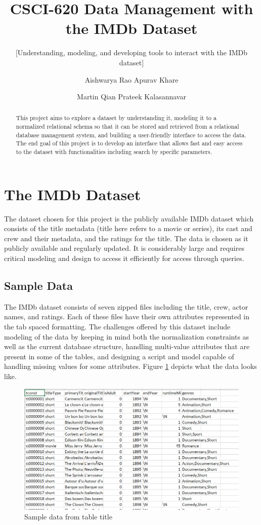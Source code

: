 \documentclass{sig-alternate}
\title{CSCI-620 Data Management with the IMDb Dataset}
\subtitle{[Understanding, modeling, and developing tools to interact with the IMDb dataset]}
\author
{
\alignauthor
  Aishwarya Rao
  \email{ar2711@rit.edu}
\alignauthor
  Apurav Khare
  \email{ak2816@rit.edu}
\and
\alignauthor
  Martin Qian
  \email{jq3513@rit.edu}
\alignauthor
  Prateek Kalasannavar
  \email{pk6685@rit.edu}
}
\begin{document}
\maketitle
\begin{abstract}
This project aims to explore a dataset by understanding it, modeling it to a normalized relational schema so that it can be stored and retrieved from a relational database management system, and building a user-friendly interface to access the data. The end goal of this project is to develop an interface that allows fast and easy access to the dataset with functionalities including search by specific parameters. 
\end{abstract}

\section{The IMDb Dataset}
The dataset chosen for this project is the publicly available IMDb dataset which consists of the title metadata (title here refers to a movie or series), its cast and crew and their metadata, and the ratings for the title. The data is chosen as it publicly available and regularly updated. It is considerably large and requires critical modeling and design to access it efficiently for access through queries.
\subsection{Sample Data}
The IMDb dataset consists of seven zipped files including the title, crew, actor names, and ratings. Each of these files have their own attributes represented in the tab spaced formatting. The challenges offered by this dataset include modeling of the data by keeping in mind both the normalization constraints as well as the current database structure, handling multi-value attributes that are present in some of the tables, and designing a script and model capable of handling missing values for some attributes. Figure \ref{sample} depicts what the data looks like.
\begin{figure}
	\includegraphics[width = \linewidth]{sample.png}
	\caption{Sample data from table title}
	\label{sample}
\end{figure}
\end{document}
